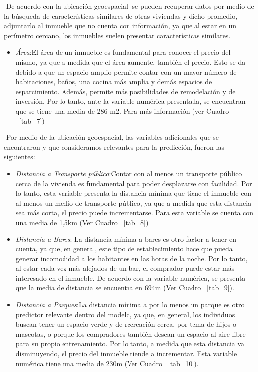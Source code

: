 \documentclass[conference, 10pt]{IEEEtran}
\begin{document}
-De acuerdo con la ubicación geoespacial, se pueden recuperar datos por medio de la búsqueda de características similares de otras viviendas y dicho promedio, adjuntarlo al inmueble que no cuenta con información, ya que al estar en un perímetro cercano, los inmuebles suelen presentar características similares.
\begin{itemize}
\item \textit{Área}:El área de un inmueble es fundamental para conocer el precio del mismo, ya que a medida que el área aumente, también el precio. Esto se da debido a que un espacio amplio permite contar con un mayor número de habitaciones, baños, una cocina más amplia y demás espacios de esparcimiento. Además, permite más posibilidades de remodelación y de inversión. Por lo tanto, ante la variable numérica presentada, se encuentran que se tiene una media de 286 m2. Para más información (ver Cuadro ~\ref{tab_7})

\end{itemize}

-Por medio de la ubicación geoespacial, las variables adicionales que se encontraron y que consideramos relevantes para la predicción, fueron las siguientes: 
\begin{itemize}
\item \textit{Distancia a Transporte público}:Contar con al menos un transporte público cerca de la vivienda es fundamental para poder desplazarse con facilidad. Por lo tanto, esta variable presenta la distancia mínima que tiene el inmueble con al menos un medio de transporte público, ya que a medida que esta distancia sea más corta, el precio puede incrementarse. Para esta variable se cuenta con una media de 1,5km (Ver Cuadro ~\ref{tab_8})
\item \textit{Distancia a Bares}: La distancia mínima a bares es otro factor a tener en cuenta, ya que, en general, este tipo de establecimiento hace que pueda generar incomodidad a los habitantes en las horas de la noche. Por lo tanto, al estar cada vez más alejados de un bar, el comprador puede estar más interesado en el inmueble. De acuerdo con la variable numérica, se presenta que la media de distancia se encuentra en 694m (Ver Cuadro ~\ref{tab_9}).
\item \textit{Distancia a Parques}:La distancia mínima a por lo menos un parque es otro predictor relevante dentro del modelo, ya que, en general, los individuos buscan tener un espacio verde y de recreación cerca, por tema de hijos o mascotas, o porque los compradores también desean un espacio al aire libre para su propio entrenamiento. Por lo tanto, a medida que esta distancia va disminuyendo, el precio del inmueble tiende a incrementar. Esta variable numérica tiene una media de 230m (Ver Cuadro ~\ref{tab_10}). 
\end{itemize}
\end{document}
